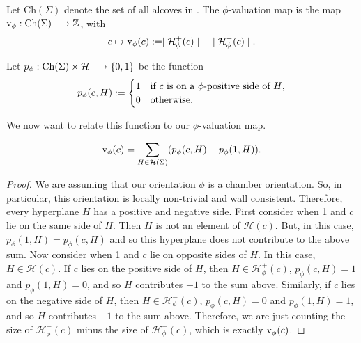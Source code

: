 \documentclass[11pt]{article}
\begin{document}
\begin{definition}
    Let Ch$(\Sigma)$ denote the set of all alcoves in \sg. The $\phi$-valuation map is the map $\textnormal{v}_\phi:\textnormal{Ch}(\Sigma)\longrightarrow\mathbb{Z}$, with
    \[c\mapsto \textnormal{v}_\phi(c):= \mid \mathcal{H}_{\phi}^+(c)\mid -\mid \mathcal{H}_{\phi}^-(c)\mid .\]
\end{definition}

\begin{definition}
    Let $p_\phi : \textnormal{Ch}(\Sigma)\times \mathcal{H}\longrightarrow \{0,1\}$ be the function 
    \[p_\phi(c,H):= \begin{cases}
        1 & \textnormal{if $c$ is on a $\phi$-positive side of $H$,}\\
        0 & \textnormal{otherwise.}
    \end{cases}\]
\end{definition}

We now want to relate this function to our $\phi$-valuation map.

\begin{lemma}
    \[\textnormal{v}_\phi(c)=\sum_{H\in\mathcal{H}(\Sigma)}(p_{\phi}(c,H)-p_\phi(1,H)).\]
\end{lemma}

\begin{proof}
    We are assuming that our orientation $\phi$ is a chamber orientation. So, in particular, this orientation is locally non-trivial and wall consistent. Therefore, every hyperplane $H$ has a positive and negative side. First consider when 1 and $c$ lie on the same side of $H$. Then $H$ is not an element of $\mathcal{H}(c)$. But, in this case, $p_\phi(1,H)=p_\phi(c,H)$ and so this hyperplane does not contribute to the above sum. 
    Now consider when 1 and $c$ lie on opposite sides of $H$. In this case, $H\in \mathcal{H}(c)$. If $c$ lies on the positive side of $H$, then $H\in\mathcal{H}_{\phi}^+(c)$, $p_\phi(c,H)=1$ and $p_\phi(1,H)=0$, and so $H$ contributes $+1$ to the sum above. Similarly, if $c$ lies on the negative side of $H$, then $H\in\mathcal{H}_{\phi}^-(c)$, $p_\phi(c,H)=0$ and $p_\phi(1,H)=1$, and so $H$ contributes $-1$ to the sum above. Therefore, we are just counting the size of $\mathcal{H}_{\phi}^+(c)$ minus the size of $\mathcal{H}_{\phi}^-(c)$, which is exactly $\textnormal{v}_\phi(c)$. 
\end{proof}


\end{document}
